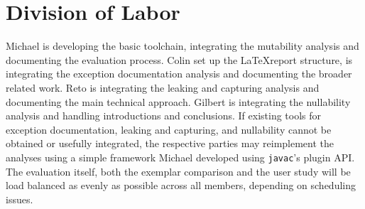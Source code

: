 
\section{Division of Labor}

Michael is developing the basic toolchain, integrating the mutability analysis
and documenting the evaluation process. Colin set up the \LaTeX report
structure, is integrating the exception documentation analysis and documenting
the broader related work. Reto is integrating the leaking and capturing
analysis and documenting the main technical approach. Gilbert is integrating
the nullability analysis and handling introductions and conclusions. If
existing tools for exception documentation, leaking and capturing, and
nullability cannot be obtained or usefully integrated, the respective parties
may reimplement the analyses using a simple framework Michael developed using
\texttt{javac}'s plugin API.  The evaluation itself, both the exemplar
comparison and the user study will be load balanced as evenly as possible across
all members, depending on scheduling issues.
